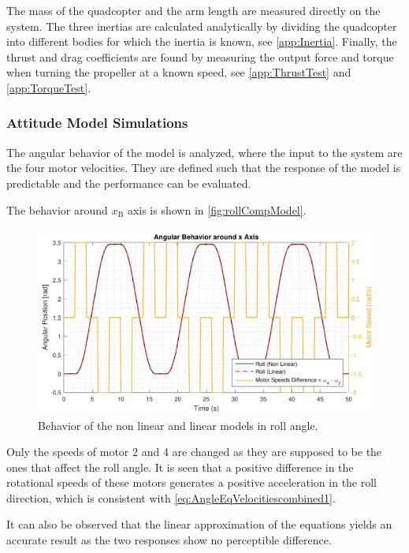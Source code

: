 The mass of the quadcopter and the arm length are measured directly on the system. The three inertias are calculated analytically by dividing the quadcopter into different bodies for which the inertia is known, see \autoref{app:Inertia}. Finally, the thrust and drag coefficients are found by measuring the output force and torque when turning the propeller at a known speed, see \autoref{app:ThrustTest} and \ref{app:TorqueTest}.

\subsubsection{Attitude Model Simulations}
The angular behavior of the model is analyzed, where the input to the system are the four motor velocities. They are defined such that the response of the model is predictable and the performance can be evaluated.

The behavior around $x_{\mathrm{B}}$ axis is shown in \autoref{fig:rollCompModel}. 
%
\begin{figure}[H]
	\centering
	\includegraphics[scale=0.65]{figures/rollCompModel}
	\caption{Behavior of the non linear and linear models in roll angle.}
	\label{fig:rollCompModel}
\end{figure}
%
Only the speeds of motor 2 and 4 are changed as they are supposed to be the ones that affect the roll angle. It is seen that a positive difference in the rotational speeds of these motors generates a positive acceleration in the roll direction, which is consistent with \autoref{eq:AngleEqVelocitiescombined1}.

It can also be observed that the linear approximation of the equations yields an accurate result as the two responses show no perceptible difference.

